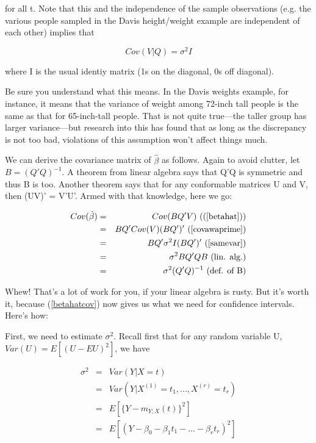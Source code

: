 for all t.  Note that this and the independence of the sample
observations (e.g. the various people sampled in the Davis height/weight
example are independent of each other) implies that

\begin{equation}
\label{samevar}
Cov(V|Q) = \sigma^2 I
\end{equation}

where I is the usual identiy matrix (1s on the diagonal, 0s off
diagonal).

Be sure you understand what this means.  In the Davis weights example,
for instance, it means that the variance of weight among 72-inch tall
people is the same as that for 65-inch-tall people.  That is not quite
true---the taller group has larger variance---but research into this has
found that as long as the discrepancy is not too bad, violations of this
assumption won't affect things much.


We can derive the covariance matrix of $\hat{\beta}$ as follows.  Again
to avoid clutter, let $B = (Q'Q)^{-1}$.  A theorem from linear algebra
says that Q'Q is symmetric and thus B is too.  Another theorem says that
for any conformable matrices U and V, then (UV)' = V'U'.  Armed with
that knowledge, here we go:

\begin{eqnarray}
Cov(\hat{\beta}) &=& 
Cov (
BQ'V
) ~ \textrm{((\ref{betahat}))} \\ 
&=& BQ' Cov(V) (BQ')' ~ \textrm{(\ref{covawaprime})} \\
&=& BQ' \sigma^2 I (BQ')' ~ \textrm{(\ref{samevar})} \\
&=& \sigma^2 BQ' QB ~ \textrm{(lin. alg.)} \\
&=& \sigma^2 (Q'Q)^{-1} ~ \textrm{(def. of B)} \label{betahatcov}
\end{eqnarray}


Whew!  That's a lot of work for you, if your linear algebra is rusty.
But it's worth it, because (\ref{betahatcov}) now gives us what we need
for confidence intervals.  Here's how:

First, we need to estimate $\sigma^2$.  Recall first that for any 
random variable U, $Var(U) = E[(U-EU)^2]$, we have

\begin{eqnarray}
\sigma^2 &=& Var(Y|X=t) \\
&=& Var(Y|X^{(1)}=t_1,...,X^{(r)}=t_r) \\
&=& E \left [ \{ Y - m_{Y;X}(t) \}^2 \right ] \\
&=& E \left [ (Y - \beta_0 - \beta_1 t_1 - ...  - \beta_r t_r)^2 \right ]
\end{eqnarray}

